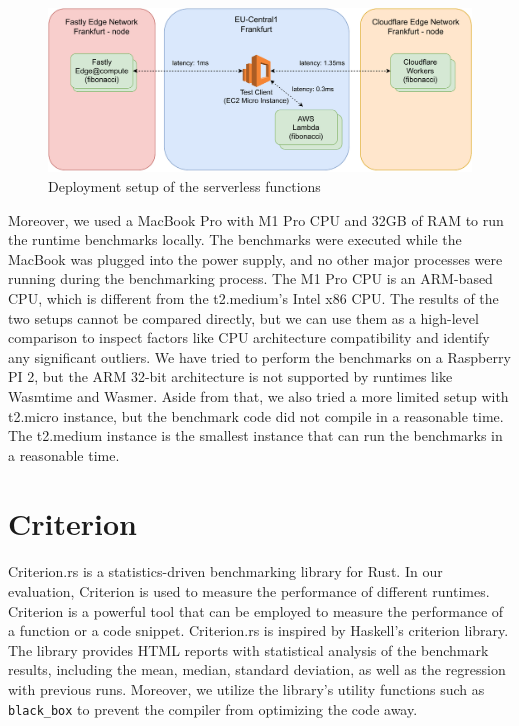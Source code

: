 \begin{figure}[htbp]
    \centering
        \includegraphics[width=1\linewidth]{images/evaluation/evaluation_setup.drawio.pdf}
    \caption{Deployment setup of the serverless functions}
    \label{fig:eval:setup}
\end{figure}

Moreover, we used a MacBook Pro with M1 Pro CPU and 32GB of RAM to run the runtime benchmarks locally. The benchmarks were executed while the MacBook was plugged into the power supply, and no other major processes were running during the benchmarking process. The M1 Pro CPU is an ARM-based CPU, which is different from the t2.medium's Intel x86 CPU. The results of the two setups cannot be compared directly, but we can use them as a high-level comparison to inspect factors like CPU architecture compatibility and identify any significant outliers. We have tried to perform the benchmarks on a Raspberry PI 2, but the ARM 32-bit architecture is not supported by runtimes like Wasmtime and Wasmer. Aside from that, we also tried a more limited setup with t2.micro instance, but the benchmark code did not compile in a reasonable time. The t2.medium instance is the smallest instance that can run the benchmarks in a reasonable time. 

\section{Criterion}
\label{sec:criterion}

Criterion.rs \cite{heisler_2023_criterionrs} is a statistics-driven benchmarking library for Rust. In our evaluation, Criterion is used to measure the performance of different runtimes. Criterion is a powerful tool that can be employed to measure the performance of a function or a code snippet. Criterion.rs is inspired by Haskell's criterion library. The library provides HTML reports with statistical analysis of the benchmark results, including the mean, median, standard deviation, as well as the regression with previous runs. Moreover, we utilize the library's utility functions such as \texttt{black\_box} to prevent the compiler from optimizing the code away.

